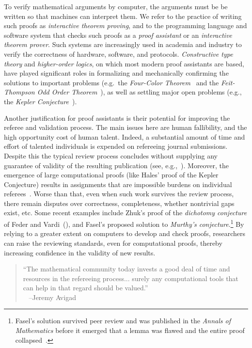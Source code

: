 \documentclass[12pt]{amsart}  %
\begin{document}
To verify mathematical arguments by computer, the arguments must be be written so that machines
can interpret them. We refer to the practice of writing such proofs as \emph{interactive theorem proving}, and to the programming language and software system that checks such proofs as a \emph{proof assistant} or an \emph{interactive theorem prover}.  Such systems are increasingly used in academia and industry to verify the correctness of hardware, software, and protocols. \emph{Constructive type theory} and \emph{higher-order logics}, on which most modern proof assistants are based, have played significant roles in formalizing and mechanically confirming the solutions to important problems (e.g.~the \emph{Four-Color Theorem}~\cite{MR2463991} 
and the \emph{Feit-Thompson Odd Order Theorem}~\cite{gonthier:2013b}), as well as settling major open problems (e.g., the \emph{Kepler Conjecture}~\cite{MR3659768}).

Another justification for proof assistants is their potential for improving the referee and validation process.  The main issues here are human fallibility, and the high opportunity cost of human talent. Indeed, a substantial amount of time and effort of talented individuals is expended on refereeing journal submissions. Despite this the typical review process concludes without supplying any guarantee of validity of the resulting publication (see, e.g.,~\cite{fasel:2017}).
Moreover, the emergence of large computational proofs (like Hales' proof of the Kepler Conjecture) results in assignments that are impossible burdens on individual referees~\cite{heule:2017}. Worse than that, even when such work survives the review process, there remain disputes over correctness, completeness, whether nontrivial gaps exist, etc. Some recent examples include %
Zhuk's proof of the \emph{\csp dichotomy conjecture} of Feder and 
Vardi~(\cite{zhuk:2017}), and Fasel's proposed solution to 
  \emph{Murthy's conjecture}.\footnote{Fasel's solution survived peer review 
  and was published in the \emph{Annals of Mathematics} before it emerged that a lemma was flawed and the entire proof collapsed~\cite{fasel:2017}.} 
By relying to a greater extent on computers to develop and check proofs, researchers can raise the reviewing standards, even for computational proofs, thereby increasing confidence in the validity of new results. 

\begin{quote}
  ``The mathematical community today invests a good deal of time and resources in the refereeing process... surely any computational tools that can help in that regard should be valued.''\\[4pt]
  ~ \phantom{x} \hfill  --Jeremy Avigad
\end{quote}
\end{document}
